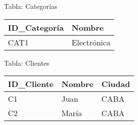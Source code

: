 \documentclass[12pt]{article}
\begin{document}
Tabla: Categorías
\begin{center}
\begin{tabular}{ll}
\toprule
ID\_Categoría & Nombre \\
\midrule
CAT1 & Electrónica \\
\bottomrule
\end{tabular}
\end{center}

Tabla: Clientes
\begin{center}
\begin{tabular}{lll}
\toprule
ID\_Cliente & Nombre & Ciudad \\
\midrule
C1 & Juan & CABA \\
C2 & María & CABA \\
\bottomrule
\end{tabular}
\end{center}
\end{document}
